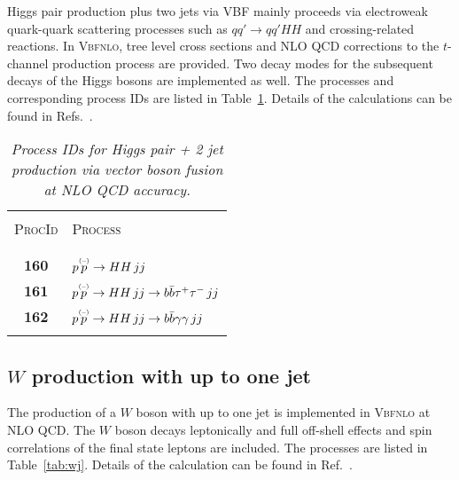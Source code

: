 \documentclass[english,12pt]{article}
\begin{document}
Higgs pair production plus two jets via VBF mainly proceeds via
electroweak quark-quark scattering processes such as $qq'\to qq'HH$ and
crossing-related reactions. In \textsc{Vbfnlo}, tree level cross
sections and NLO QCD corrections to the $t$-channel production process
are provided. Two decay modes for the subsequent decays of the Higgs bosons are 
implemented as well. The processes and corresponding process IDs are listed
in Table~\ref{tab:hhjj}.  Details of the calculations can be found in
Refs.~\cite{Figy:2008zd,Baglio:2012np}.

\begin{table}[htb!]
\newcommand{\lstrut}{{$\strut\atop\strut$}}
\begin{center}
\small
\begin{tabular}{c|l}
\hline
&\\
\textsc{ProcId} & \textsc{Process}\\
&\\
\hline
&\\
\bf 160 & $p \overset{\mbox{\tiny{(--)}}}{p} \to HH \,  jj$ \\
\bf 161 & $p \overset{\mbox{\tiny{(--)}}}{p} \to HH \,  jj \to b\bar{b}\tau^+\tau^- \, jj$ \\
\bf 162 & $p \overset{\mbox{\tiny{(--)}}}{p} \to HH \,  jj \to b\bar{b}\gamma\gamma \, jj$ \\
&\\
\hline
\end{tabular}
\caption {\em  Process IDs for Higgs pair + 2 jet
production via vector boson fusion at NLO QCD accuracy.}
\vspace{0.2cm}
\label{tab:hhjj}
\end{center}
\end{table}





\subsection{$W$ production with up to one jet}
\label{sec:wj}

The production of a $W$ boson with up to one jet is implemented in \textsc{Vbfnlo} at NLO
QCD. 
The $W$ boson decays leptonically and full off-shell effects and spin correlations of the final state leptons are included.
The processes are listed in Table~\ref{tab:wj}.
Details of the calculation can be found in Ref.~\cite{robin}.
\end{document}
